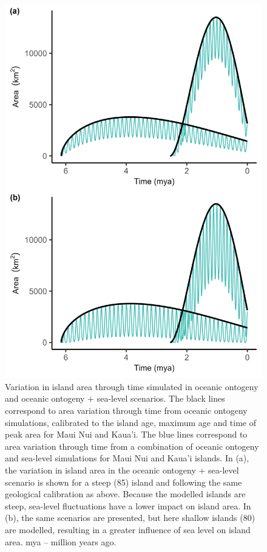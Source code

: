 \documentclass{article}
\begin{document}
\begin{figure}
    \centering
    \includegraphics{JBI-21-0508_Fig1.png}
    \caption{Variation in island area through time simulated in oceanic ontogeny and oceanic ontogeny + sea-level scenarios. The black lines correspond to area variation through time from oceanic ontogeny simulations, calibrated to the island age, maximum age and time of peak area for Maui Nui and Kaua'i. The blue lines correspond to area variation through time from a combination of oceanic ontogeny and sea-level simulations for Maui Nui and Kaua'i islands. In (a), the variation in island area in the oceanic ontogeny + sea-level scenario is shown for a steep (85\degree) island and following the same geological calibration as above. Because the modelled islands are steep, sea-level fluctuations have a lower impact on island area. In (b), the same scenarios are presented, but here shallow islands (80\degree) are modelled, resulting in a greater influence of sea level on island area. mya – million years ago.}
    \label{fig:area}
\end{figure}
\end{document}
